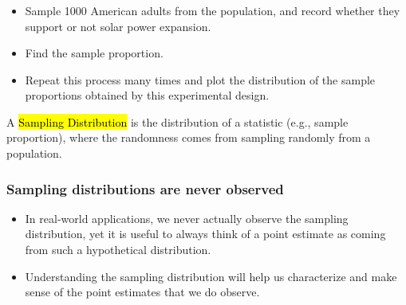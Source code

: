\documentclass[t,compress,mathserif]{beamer}
\begin{document}

\begin{frame}
    \frametitle{}
    
    
    \begin{itemize}
    
    \item Sample 1000 American adults from the population, and record whether they support or not solar power expansion.
    
    \item Find the sample proportion.
    
    \item Repeat this process many times and plot the distribution of the sample proportions obtained by this experimental design.
    
    \end{itemize}
    
A \hl{Sampling Distribution} is the distribution of a statistic (e.g., sample proportion), where the randomness comes from sampling randomly from a population.
\end{frame}
    

\begin{frame}
    \frametitle{Sampling distributions are never observed}

    \begin{itemize}

        \item In real-world applications, we never actually observe the sampling distribution, yet it is useful to always think of a point estimate as coming from such a hypothetical distribution.
        \item Understanding the sampling distribution will help us characterize and make sense of the point estimates that we do observe.

    \end{itemize}

\end{frame}

\end{document}
